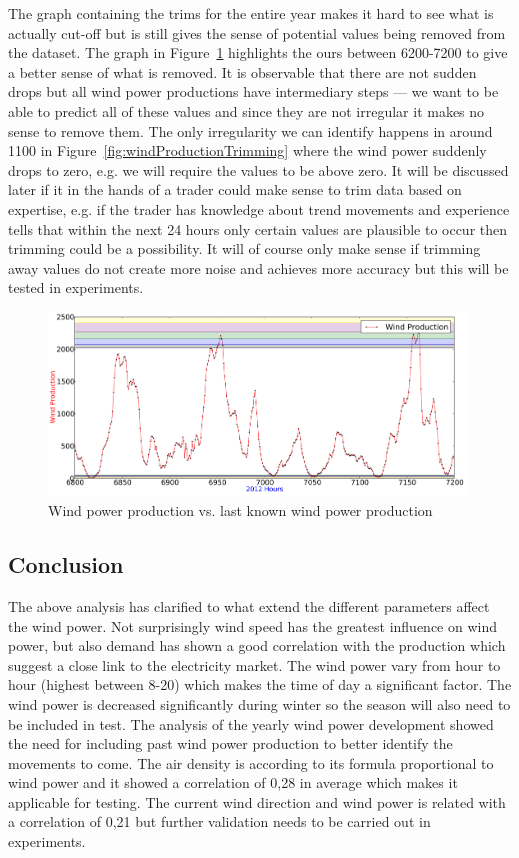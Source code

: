 The graph containing the trims for the entire year makes it hard to see what is actually cut-off but is still gives the sense of potential values being removed from the dataset. The graph in Figure~\ref{fig:pointingOutPlaceWhereTrim} highlights the ours between 6200-7200 to give a better sense of what is removed. It is observable that there are not sudden drops but all wind power productions have intermediary steps --- we want to be able to predict all of these values and since they are not irregular it makes no sense to remove them. The only irregularity we can identify happens in around 1100 in Figure~\ref{fig:windProductionTrimming} where the wind power suddenly drops to zero, e.g. we will require the values to be above zero. It will be discussed later if it in the hands of a trader could make sense to trim data based on expertise, e.g. if the trader has knowledge about trend movements and experience tells that within the next 24 hours only certain values are plausible to occur then trimming could be a possibility. It will of course only make sense if trimming away values do not create more noise and achieves more accuracy but this will be tested in experiments.

\begin{figure}[H]
\centering
\includegraphics[width=0.99\textwidth]{billeder/pointingOutPlaceWhereTrim.png}
\caption{Wind power production vs. last known wind power production}
\label{fig:pointingOutPlaceWhereTrim}
\end{figure}

\subsection{Conclusion}
The above analysis has clarified to what extend the different parameters affect the wind power. Not surprisingly wind speed has the greatest influence on wind power, but also demand has shown a good correlation with the production which suggest a close link to the electricity market. The wind power vary from hour to hour (highest between 8-20) which makes the time of day a significant factor. The wind power is decreased significantly during winter so the season will also need to be included in test. The analysis of the yearly wind power development showed the need for including past wind power production to better identify the movements to come.
The air density is according to its formula proportional to wind power and it showed a correlation of 0,28 in average which makes it applicable for testing. The current wind direction and wind power is related with a correlation of 0,21 but further validation needs to be carried out in experiments.